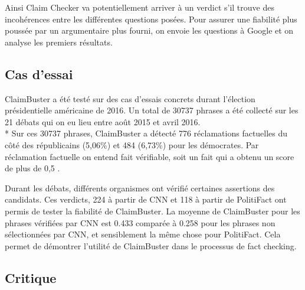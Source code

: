 Ainsi Claim Checker va potentiellement arriver à un verdict s'il trouve des incohérences entre les différentes questions posées. Pour assurer une fiabilité plus poussée par un argumentaire plus fourni, on envoie les questions à Google et on analyse les premiers résultats.

\subsection{Cas d'essai}

ClaimBuster a été testé sur des cas d'essais concrets durant l'élection présidentielle américaine de 2016. Un total de 30737 phrases a été collecté sur les 21 débats qui on eu lieu entre août 2015 et avril 2016.
\\*
Sur ces 30737 phrases, ClaimBuster a détecté 776 réclamations factuelles du côté des républicains (5,06\%) et 484 (6,73\%) pour les démocrates. Par réclamation factuelle on entend fait vérifiable, soit un fait qui a obtenu un score de plus de 0,5 \cite{hassan2017toward}.

Durant les débats, différents organismes ont vérifié certaines assertions des candidats. Ces verdicts, 224 à partir de CNN et 118 à partir de PolitiFact ont permis de tester la fiabilité de ClaimBuster. La moyenne de ClaimBuster pour les phrases vérifiées par CNN est 0.433 comparée à 0.258 pour les phrases non sélectionnées par CNN, et sensiblement la même chose pour PolitiFact. Cela permet de démontrer l'utilité de ClaimBuster dans le processus de fact checking.

\subsection{Critique}

